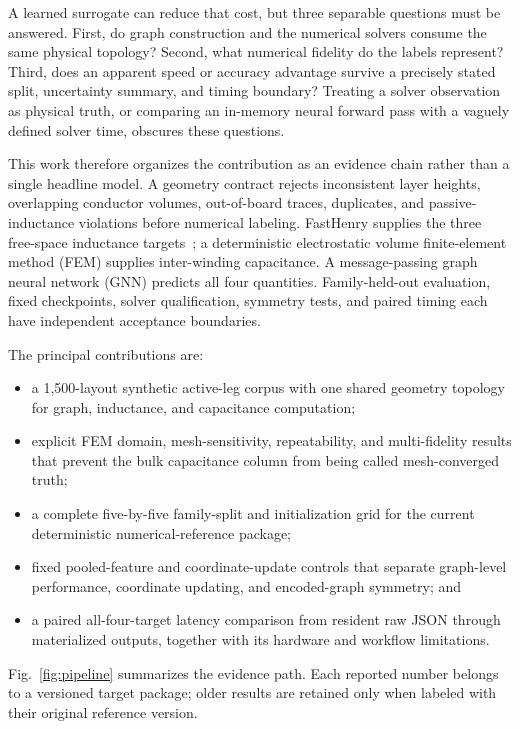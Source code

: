 \documentclass[journal]{IEEEtran}
\begin{document}
A learned surrogate can reduce that cost, but three separable questions must be answered. First, do graph construction and the numerical solvers consume the same physical topology? Second, what numerical fidelity do the labels represent? Third, does an apparent speed or accuracy advantage survive a precisely stated split, uncertainty summary, and timing boundary? Treating a solver observation as physical truth, or comparing an in-memory neural forward pass with a vaguely defined solver time, obscures these questions.

This work therefore organizes the contribution as an evidence chain rather than a single headline model. A geometry contract rejects inconsistent layer heights, overlapping conductor volumes, out-of-board traces, duplicates, and passive-inductance violations before numerical labeling. FastHenry supplies the three free-space inductance targets~\cite{fasthenry}; a deterministic electrostatic volume finite-element method (FEM) supplies inter-winding capacitance. A message-passing graph neural network (GNN) predicts all four quantities. Family-held-out evaluation, fixed checkpoints, solver qualification, symmetry tests, and paired timing each have independent acceptance boundaries.

The principal contributions are:
\begin{itemize}
\item a 1,500-layout synthetic active-leg corpus with one shared geometry topology for graph, inductance, and capacitance computation;
\item explicit FEM domain, mesh-sensitivity, repeatability, and multi-fidelity results that prevent the bulk capacitance column from being called mesh-converged truth;
\item a complete five-by-five family-split and initialization grid for the current deterministic numerical-reference package;
\item fixed pooled-feature and coordinate-update controls that separate graph-level performance, coordinate updating, and encoded-graph symmetry; and
\item a paired all-four-target latency comparison from resident raw JSON through materialized outputs, together with its hardware and workflow limitations.
\end{itemize}

Fig.~\ref{fig:pipeline} summarizes the evidence path. Each reported number belongs to a versioned target package; older results are retained only when labeled with their original reference version.
\end{document}
